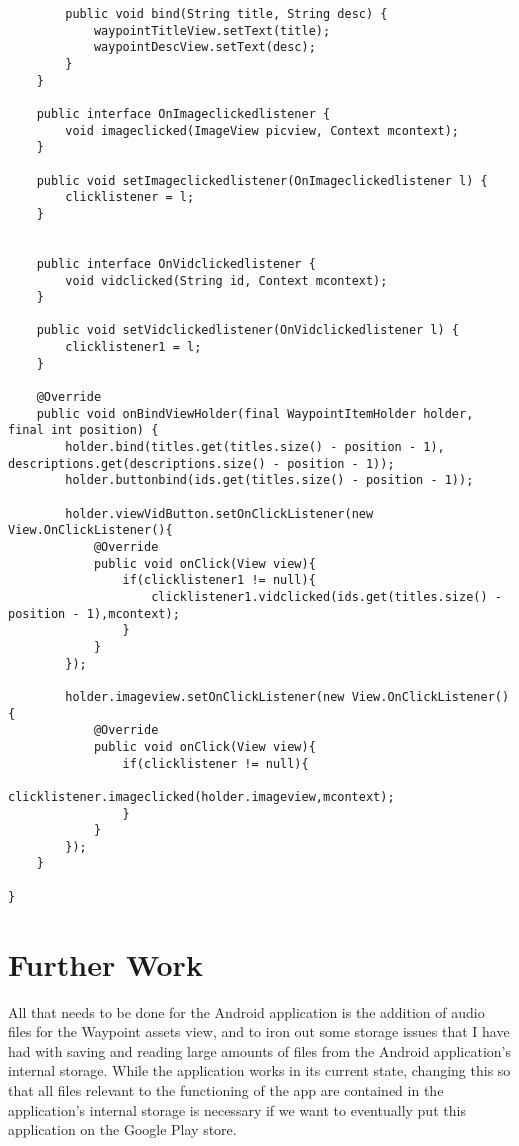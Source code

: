 \documentclass[letterpaper, 10pt,titlepage]{article}
\begin{document}
\begin{verbatim}
        public void bind(String title, String desc) {
            waypointTitleView.setText(title);
            waypointDescView.setText(desc);
        }
    }
    
    public interface OnImageclickedlistener {
        void imageclicked(ImageView picview, Context mcontext);
    }

    public void setImageclickedlistener(OnImageclickedlistener l) {
        clicklistener = l;
    }


    public interface OnVidclickedlistener {
        void vidclicked(String id, Context mcontext);
    }

    public void setVidclickedlistener(OnVidclickedlistener l) {
        clicklistener1 = l;
    }

    @Override
    public void onBindViewHolder(final WaypointItemHolder holder, final int position) {
        holder.bind(titles.get(titles.size() - position - 1), descriptions.get(descriptions.size() - position - 1));
        holder.buttonbind(ids.get(titles.size() - position - 1));

        holder.viewVidButton.setOnClickListener(new View.OnClickListener(){
            @Override
            public void onClick(View view){
                if(clicklistener1 != null){
                    clicklistener1.vidclicked(ids.get(titles.size() - position - 1),mcontext);
                }
            }
        });

        holder.imageview.setOnClickListener(new View.OnClickListener(){
            @Override
            public void onClick(View view){
                if(clicklistener != null){
                    clicklistener.imageclicked(holder.imageview,mcontext);
                }
            }
        });
    }

}
\end{verbatim}

\section{Further Work}
All that needs to be done for the Android application is the addition of audio files for the Waypoint assets view, and to iron out some storage issues that I have had with saving and reading large amounts of files from the Android application's internal storage. While the application works in its current state, changing this so that all files relevant to the functioning of the app are contained in the application's internal storage is necessary if we want to eventually put this application on the Google Play store.
\end{document}
